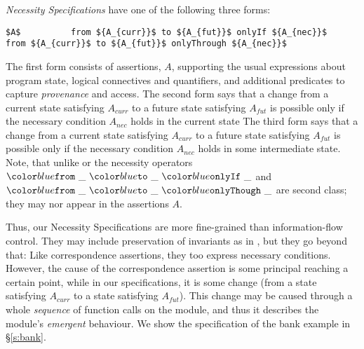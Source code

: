 \textit{Necessity Specifications}   have one of the following three forms:
%
%
%
%
\begin{lstlisting}[mathescape=true, language=chainmail, frame=lines]
       $A$          from ${A_{curr}}$ to ${A_{fut}}$ onlyIf ${A_{nec}}$          from ${A_{curr}}$ to ${A_{fut}}$ onlyThrough ${A_{nec}}$
\end{lstlisting}
%
The first form consists of assertions,  $A$, supporting the usual expressions about program state,
  logical connectives and quantifiers, 
 and additional predicates
 to capture \textit{provenance} and access.
The second form says that  a change from a current state satisfying $A_{curr}$ to a future
state satisfying $A_{fut}$ %
is possible only if the necessary condition
$A_{nec}$ holds in the current state
%
The third form says that a change from a current state satisfying $A_{curr}$ to a future
state satisfying $A_{fut}$  is possible only if the necessary condition
$A_{nec}$ holds in some intermediate state.
 Note, that unlike \citeauthor{VerX} or \citeauthor{FASE}
 the necessity operators $\onlyIf {\_} {\_} {\_}$  and $\onlyThrough {\_} {\_} {\_}$
 are second class; they may nor appear in the assertions $A$.

Thus, our Necessity Specifications are more fine-grained than information-flow control.
They may include preservation
of invariants as in \cite{ddd}, but they go beyond that:   
Like correspondence assertions, they too express necessary conditions.
However, the cause of the correspondence assertion is some principal reaching
a certain point, while in our specifications, it is some change (from a state
satisfying ${A_{curr}}$ to a state satisfying ${A_{fut}}$).
This change may be caused through  a whole \emph{sequence} of  function 
calls on the module, and thus it describes the module's \emph{emergent}
behaviour. 
We show the specification of the bank example in  \S\ref{s:bank}.


